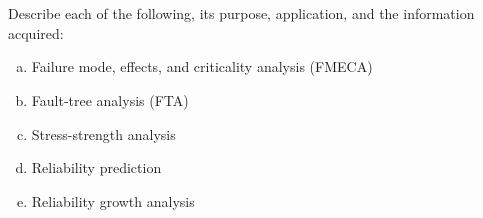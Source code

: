 \documentclass[12pt]{article}
\begin{document}
\newpage
\section*{}
Describe each of the following, its purpose, application, and the information acquired:
\begin{enumerate}[(a)] %
  \item Failure mode, effects, and criticality analysis (FMECA)
  \item Fault-tree analysis (FTA)
  \item Stress-strength analysis
  \item Reliability prediction
  \item Reliability growth analysis
\end{enumerate}
\end{document}
